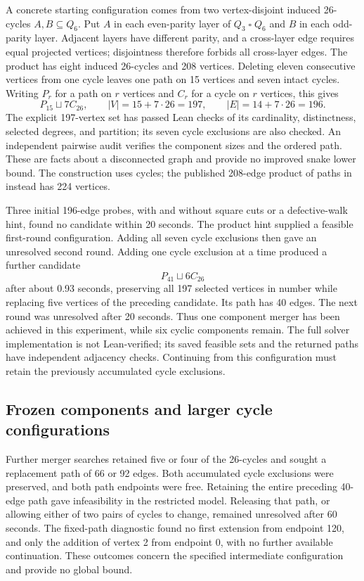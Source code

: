 \documentclass[11pt,a4paper]{article}
\theoremstyle{definition}
\theoremstyle{remark}
\newcommand{\Q}{Q}
\begin{document}
A concrete starting configuration comes from two vertex-disjoint induced 26-cycles $A,B\subseteq\Q_6$. Put $A$ in each even-parity layer of $\Q_3\mathbin{\square}\Q_6$ and $B$ in each odd-parity layer. Adjacent layers have different parity, and a cross-layer edge requires equal projected vertices; disjointness therefore forbids all cross-layer edges. The product has eight induced 26-cycles and 208 vertices. Deleting eleven consecutive vertices from one cycle leaves one path on 15 vertices and seven intact cycles. Writing $P_r$ for a path on $r$ vertices and $C_r$ for a cycle on $r$ vertices, this gives
\[
P_{15}\sqcup 7C_{26},\qquad
|V|=15+7\cdot26=197,\qquad |E|=14+7\cdot26=196.
\]
The explicit 197-vertex set has passed Lean checks of its cardinality, distinctness, selected degrees, and partition; its seven cycle exclusions are also checked. An independent pairwise audit verifies the component sizes and the ordered path. These are facts about a disconnected graph and provide no improved snake lower bound. The construction uses cycles; the published 208-edge product of paths in \cite{orland} instead has 224 vertices.

Three initial 196-edge probes, with and without square cuts or a defective-walk hint, found no candidate within 20 seconds. The product hint supplied a feasible first-round configuration. Adding all seven cycle exclusions then gave an unresolved second round. Adding one cycle exclusion at a time produced a further candidate
\[
P_{41}\sqcup 6C_{26}
\]
after about 0.93 seconds, preserving all 197 selected vertices in number while replacing five vertices of the preceding candidate. Its path has 40 edges. The next round was unresolved after 20 seconds. Thus one component merger has been achieved in this experiment, while six cyclic components remain. The full solver implementation is not Lean-verified; its saved feasible sets and the returned paths have independent adjacency checks. Continuing from this configuration must retain the previously accumulated cycle exclusions.

\subsection{Frozen components and larger cycle configurations}
Further merger searches retained five or four of the 26-cycles and sought a replacement path of 66 or 92 edges. Both accumulated cycle exclusions were preserved, and both path endpoints were free. Retaining the entire preceding 40-edge path gave infeasibility in the restricted model. Releasing that path, or allowing either of two pairs of cycles to change, remained unresolved after 60 seconds. The fixed-path diagnostic found no first extension from endpoint 120, and only the addition of vertex 2 from endpoint 0, with no further available continuation. These outcomes concern the specified intermediate configuration and provide no global bound.
\end{document}
